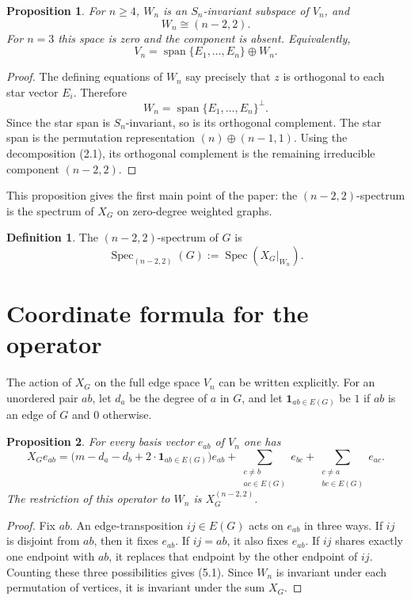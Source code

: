 \documentclass{amsart}
\newtheorem{proposition}{Proposition}
\theoremstyle{definition}
\newtheorem{definition}{Definition}
\newcommand{\Spec}{\operatorname{Spec}}
\begin{document}
\begin{proposition}
For $n\geq 4$, $W_n$ is an $S_n$-invariant subspace of $V_n$, and
\[
W_n\cong (n-2,2).
\]
For $n=3$ this space is zero and the component is absent.
Equivalently,
\[
V_n=\operatorname{span}\{E_1,\ldots,E_n\}\oplus W_n.
\]
\end{proposition}

\begin{proof}
The defining equations of $W_n$ say precisely that $z$ is orthogonal to
each star vector $E_i$.  Therefore
\[
W_n=\operatorname{span}\{E_1,\ldots,E_n\}^{\perp}.
\]
Since the star span is $S_n$-invariant, so is its orthogonal complement.
The star span is the permutation representation $(n)\oplus(n-1,1)$.
Using the decomposition (2.1), its orthogonal complement is the remaining
irreducible component $(n-2,2)$.
\end{proof}

This proposition gives the first main point of the paper: the
$(n-2,2)$-spectrum is the spectrum of $X_G$ on zero-degree weighted
graphs.

\begin{definition}
The $(n-2,2)$-spectrum of $G$ is
\[
\Spec_{(n-2,2)}(G):=\Spec\left(X_G|_{W_n}\right).
\]
\end{definition}

\section{Coordinate formula for the operator}

The action of $X_G$ on the full edge space $V_n$ can be written explicitly.
For an unordered pair $ab$, let $d_a$ be the degree of $a$ in $G$, and
let $\mathbf 1_{ab\in E(G)}$ be $1$ if $ab$ is an edge of $G$ and $0$
otherwise.

\begin{proposition}
For every basis vector $e_{ab}$ of $V_n$ one has
\[
X_G e_{ab}
=
\bigl(m-d_a-d_b+2\cdot \mathbf 1_{ab\in E(G)}\bigr)e_{ab}
+
\sum_{\substack{c\ne b\\ ac\in E(G)}} e_{bc}
+
\sum_{\substack{c\ne a\\ bc\in E(G)}} e_{ac}.
\tag{5.1}
\]
The restriction of this operator to $W_n$ is $X_G^{(n-2,2)}$.
\end{proposition}

\begin{proof}
Fix $ab$.  An edge-transposition $ij\in E(G)$ acts on $e_{ab}$ in three
ways.  If $ij$ is disjoint from $ab$, then it fixes $e_{ab}$.  If
$ij=ab$, it also fixes $e_{ab}$.  If $ij$ shares exactly one endpoint with
$ab$, it replaces that endpoint by the other endpoint of $ij$.  Counting
these three possibilities gives (5.1).  Since $W_n$ is invariant under
each permutation of vertices, it is invariant under the sum $X_G$.
\end{proof}
\end{document}
